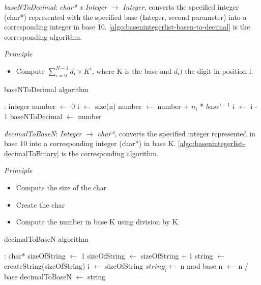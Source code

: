 \documentclass[book, nodocumentinfo]{upmethodology-document}
\begin{document}

\emph{baseNToDecimal}: \emph{char* x Integer} \(\rightarrow\) \emph{Integer},
converts the specified integer (char*) represented with the specified base (Integer, second parameter) into a corresponding integer in base 10.
\ref{algo:basenintegerlist-basen-to-decimal} is the corresponding algorithm.

\emph{Principle}
\begin{itemize}
    \item Compute \(\sum\limits_{i=0}^{N - 1}{d_i \times K^i}\), where K is the base and \(d_i)\) the digit in position i.
\end{itemize}

\begin{algorithm}[H]
	\label{algo:basenintegerlist-basen-to-decimal}
	\caption{baseNToDecimal algorithm}

	\begin{algorithmic}
		 : integer
			\State number \(\leftarrow\) 0
			\State i \(\leftarrow\) size(n)
				\State number \(\leftarrow\) number + \(n_i\) * \(base^{i-1}\)
				\State i \(\leftarrow\) i - 1
			\EndWhile
			\State baseNToDecimal \(\leftarrow\) number
		\EndFunction
	\end{algorithmic}
\end{algorithm}

\emph{decimalToBaseN}: \emph{Integer} \(\rightarrow\) \emph{char*},
converts the specified integer represented in base 10 into a corresponding integer (char*) in base K.
\ref{algo:basenintegerlist-decimalToBinary} is the corresponding algorithm.

\emph{Principle}
\begin{itemize}
    \item Compute the size of the char
    \item Create the char
    \item Compute the number in base K using division by K.
\end{itemize}

\begin{algorithm}[H]
	\label{algo:basenintegerlist-decimalToBaseN}
	\caption{decimalToBaseN algorithm}

	\begin{algorithmic}
		 : char*
			\State sizeOfString \(\leftarrow\) 1
			\While{n \(> K^{sizeOfString}\)}
				\State sizeOfString \(\leftarrow\) sizeOfString + 1
			\EndWhile
			\State string \(\leftarrow\) createString(sizeOfString)
			\State i \(\leftarrow\) sizeOfString
			\Repeat
				\State \(string_{i} \leftarrow \) n mod base
				\State n \(\leftarrow\) n / base
			\Until{n \(\neq\) 0}
			\State decimalToBaseN \(\leftarrow\) string
		\EndFunction
	\end{algorithmic}
\end{algorithm}
\end{document}
